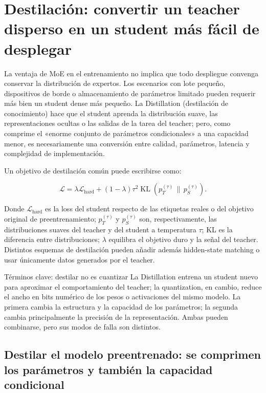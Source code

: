 \section{Destilación: convertir un teacher disperso en un student más fácil de desplegar}

La ventaja de MoE en el entrenamiento no implica que todo despliegue convenga conservar la distribución de expertos. Los escenarios con lote pequeño, dispositivos de borde o almacenamiento de parámetros limitado pueden requerir más bien un student dense más pequeño. La Distillation (destilación de conocimiento) hace que el student aprenda la distribución suave, las representaciones ocultas o las salidas de la tarea del teacher; pero, como comprime el «enorme conjunto de parámetros condicionales» a una capacidad menor, es necesariamente una conversión entre calidad, parámetros, latencia y complejidad de implementación.


Un objetivo de destilación común puede escribirse como:

\[
\mathcal{L}=\lambda\mathcal{L}_{\text{hard}}+(1-\lambda)\tau^2
\operatorname{KL}\!\left(p_T^{(\tau)}\,\|\,p_S^{(\tau)}\right).
\]

Donde $\mathcal{L}_{\text{hard}}$ es la loss del student respecto de las etiquetas reales o del objetivo original de preentrenamiento; $p_T^{(\tau)}$ y $p_S^{(\tau)}$ son, respectivamente, las distribuciones suaves del teacher y del student a temperatura $\tau$; KL es la diferencia entre distribuciones; $\lambda$ equilibra el objetivo duro y la señal del teacher. Distintos esquemas de destilación pueden añadir además hidden-state matching o usar únicamente datos generados por el teacher.

\begin{knowledgebox}{Términos clave: destilar no es cuantizar}
La Distillation entrena un student nuevo para aproximar el comportamiento del teacher; la quantization, en cambio, reduce el ancho en bits numérico de los pesos o activaciones del mismo modelo. La primera cambia la estructura y la capacidad de los parámetros; la segunda cambia principalmente la precisión de la representación. Ambas pueden combinarse, pero sus modos de falla son distintos.
\end{knowledgebox}

\subsection{Destilar el modelo preentrenado: se comprimen los parámetros y también la capacidad condicional}

